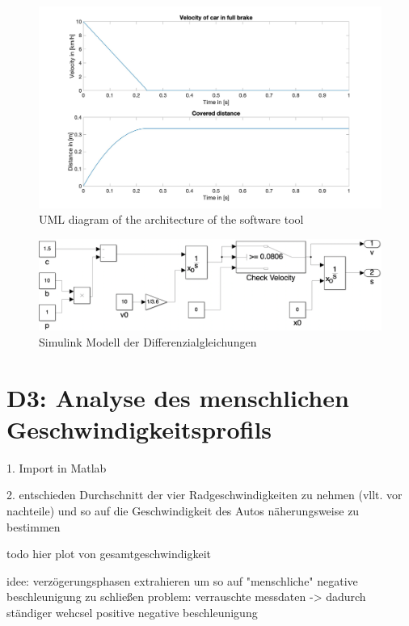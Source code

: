 \begin{figure}[H]
\centering
\includegraphics[width=1\textwidth]{images/D2_plot.jpg}
\caption{UML diagram of the architecture of the software tool}
\label{fig:ConceptArchitectureOverview}
\end{figure}

\begin{figure}[H]
\centering
\includegraphics[width=1\textwidth]{images/D2_sim.png}
\caption{Simulink Modell der Differenzialgleichungen}
\label{fig:ConceptArchitectureOverview}
\end{figure}

\chapter{D3: Analyse des menschlichen Geschwindigkeitsprofils}\label{cha:D3}

1. Import in Matlab

2. entschieden Durchschnitt der vier Radgeschwindigkeiten zu nehmen (vllt. vor nachteile)
und so auf die Geschwindigkeit des Autos näherungsweise zu bestimmen

todo hier plot von gesamtgeschwindigkeit

idee: verzögerungsphasen extrahieren um so auf "menschliche" negative beschleunigung zu schließen
problem: verrauschte messdaten -> dadurch ständiger wehcsel positive negative beschleunigung

